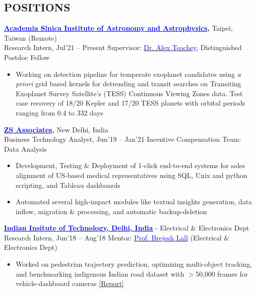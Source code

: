 \documentclass[11pt]{res} %
\newcommand{\titlegap}{5pt} %
\begin{document}
\begin{resume}


\vspace{-0.2cm}
\section{POSITIONS}
\vspace{\titlegap}


{\bf \href{https://events.asiaa.sinica.edu.tw/ssp/2021/}{\textcolor{blue}{Academia Sinica Institute of Astronomy and Astrophysics}},} Taipei, Taiwan (Remote)\\
Research Intern, Jul'21 -- Present \hfill Supervisor: \href{https://alexteachey.wordpress.com/}{\textcolor{blue}{Dr. Alex Teachey}}, Distinguished Postdoc Fellow
\begin{itemize}
 \item Working on detection pipeline for temperate exoplanet candidates using \textit{a priori} grid based kernels for detrending and transit searches on Transiting Exoplanet Survey Satellite's (TESS) Continuous Viewing Zones data. Test case recovery of 18/20 Kepler and 17/20 TESS planets with orbital periods ranging from 0.4 to 332 days
 
\end{itemize}

\vspace{-0.1cm}
{\bf \href{https://www.zs.com/}{\textcolor{blue}{ZS Associates}},} New Delhi, India\\
Business Technology Analyst, Jun'19 -- Jan'21 \hfill Incentive Compensation Team: Data Analysis
\begin{itemize}
    \item Development, Testing \& Deployment of 1-click end-to-end systems for sales alignment of US-based medical representatives using SQL, Unix and python scripting, and Tableau dashboards
    \item Automated several high-impact modules like textual insights generation, data inflow, migration \& processing, and automatic backup-deletion
\end{itemize}

\vspace{-0.1cm}
{\bf \href{https://home.iitd.ac.in/}{\textcolor{blue}{Indian Insitute of Technology, Delhi, India}}} - Electrical \& Electronics Dept\\
Research Intern, Jun'18 – Aug'18 \hfill Mentor: \href{https://web.iitd.ac.in/~brejesh/index.html}{\textcolor{blue}{Prof. Brejesh Lall}} (Electrical \& Electronics Dept)
\begin{itemize}
    \item Worked on pedestrian trajectory prediction, optimizing multi-object tracking, and benchmarking indigenous Indian road dataset with $>$50,000 frames for vehicle-dashboard cameras \textcolor{blue}{\href{https://drive.google.com/file/d/1VzW1S9UInuxXegAi2ursUIjQHOWDsS6R/view?usp=sharing}{[Report]}}
\end{itemize} 


\end{resume}
\end{document}
